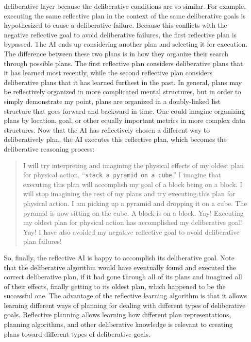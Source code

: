 deliberative layer because the deliberative conditions are so similar.
For example, executing the same reflective plan in the context of the
same deliberative goals is hypothesized to cause a deliberative
failure.  Because this conflicts with the negative reflective goal to
avoid deliberative failures, the first reflective plan is bypassed.
The AI ends up considering another plan and selecting it for
execution.  The difference between these two plans is in how they
organize their search through possible plans.  The first reflective
plan considers deliberative plans that it has learned most recently,
while the second reflective plan considers deliberative plans that it
has learned furthest in the past.  In general, plans may be
reflectively organized in more complicated mental structures, but in
order to simply demonstrate my point, plans are organized in a
doubly-linked list structure that goes forward and backward in time.
One could imagine organizing plans by location, goal, or other equally
important metrics in more complex data structures.  Now that the AI
has reflectively chosen a different way to deliberatively plan, the AI
executes this reflective plan, which becomes the deliberative
reasoning process:
\begin{quote}
  I will try interpreting and imagining the physical effects of my
  oldest plan for physical action, ``{\tt{stack a pyramid on a
      cube}}.''  I imagine that executing this plan will accomplish my
  goal of a block being on a block.  I will stop imagining the rest of
  my plans and try executing this plan for physical action.  I am
  picking up a pyramid and dropping it on a cube.  The pyramid is now
  sitting on the cube.  A block is on a block.  Yay!  Executing my
  oldest plan for physical action has accomplished my deliberative
  goal!  Yay!  I have also avoided my negative reflective goal to
  avoid deliberative plan failures!
\end{quote}
So, finally, the reflective AI is happy to accomplish its deliberative
goal.  Note that the deliberative algorithm would have eventually
found and executed the correct deliberative plan, if it had gone
through all of its plans and imagined all of their effects, finally
getting to its oldest plan, which happened to be the successful one.
The advantage of the reflective learning algorithm is that it allows
learning different ways of planning for dealing with different types
of deliberative goals.  Reflective planning allows learning how
different plan representations, planning algorithms, and other
deliberative knowledge is relevant to creating plans toward different
types of deliberative goals.

